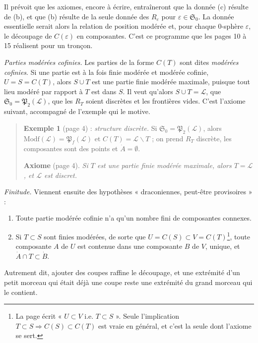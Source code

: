 \documentclass[11pt,a4paper]{article}
\begin{document}
Il prévoit que les axiomes, encore à écrire, entraîneront que la donnée (c)
résulte de (b), et que (b) résulte de la seule donnée des $R_{\varepsilon}$ pour
$\varepsilon \in \mathfrak{S}_{0}$. La donnée essentielle serait alors la
relation de position modérée et, pour chaque 0-sphère $\varepsilon$, le
découpage de $C(\varepsilon)$ en composantes. C'est ce programme que les pages
10 à 15 réalisent pour un tronçon.

\emph{Parties modérées cofinies.} Les parties de la forme $C(T)$ sont dites
\emph{modérées cofinies}. Si une partie est à la fois finie modérée et modérée
cofinie, $U = S = C(T)$, alors $S \cup T$ est une partie finie modérée
maximale, puisque tout lieu modéré par rapport à $T$ est dans $S$. Il veut
qu'alors $S \cup T = \mathcal{L}$, que $\mathfrak{S}_{0} = \mathfrak{P}_{2}
(\mathcal{L})$, que les $R_{T}$ soient discrètes et les frontières vides. C'est
l'axiome suivant, accompagné de l'exemple qui le motive.

\begin{quote}
\textbf{Exemple 1} (page 4) : \emph{structure discrète.} Si $\mathfrak{S}_{0} =
\mathfrak{P}_{2}(\mathcal{L})$, alors $\mathrm{Modf}(\mathcal{L}) =
\mathfrak{P}_{f}(\mathcal{L})$ et $C(T) = \mathcal{L} \smallsetminus T$ ; on
prend $R_{T}$ discrète, les composantes sont des points et $\dot{A} =
\emptyset$.

\textbf{Axiome} (page 4). \emph{Si $T$ est une partie finie modérée maximale,
alors $T = \mathcal{L}$, et $\mathcal{L}$ est discret.}
\end{quote}

\emph{Finitude.} Viennent ensuite des hypothèses « draconiennes, peut-être
provisoires » :
\begin{enumerate}
\item[Dec$_{1}$] Toute partie modérée cofinie n'a qu'un nombre fini de
composantes connexes.
\item[Dec$_{2}$] Si $T \subset S$ sont finies modérées, de sorte que $U = C(S)
\subset V = C(T)$\footnote{La page écrit « $U \subset V$ i.e. $T \subset S$ ».
Seule l'implication $T \subset S \Rightarrow C(S) \subset C(T)$ est vraie en
général, et c'est la seule dont l'axiome se sert.}, toute composante $A$ de $U$
est contenue dans une composante $B$ de $V$, unique, et $\dot{A} \cap T \subset
\dot{B}$.
\end{enumerate}
Autrement dit, ajouter des coupes raffine le découpage, et une extrémité d'un
petit morceau qui était déjà une coupe reste une extrémité du grand morceau qui
le contient.
\end{document}
